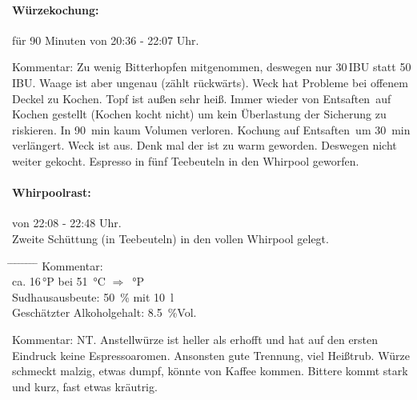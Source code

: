 \documentclass[12pt,oneside,a4paper]{scrartcl}
\begin{document}
\paragraph{Würzekochung:} für 90 Minuten von 20:36 - 22:07 Uhr.
	\begin{adjustwidth}{2cm}{0cm}
		\hspace{-1cm}Kommentar: Zu wenig Bitterhopfen mitgenommen, deswegen nur 30\,IBU statt 50\,IBU. Waage ist aber ungenau (zählt rückwärts). Weck hat Probleme bei offenem Deckel zu Kochen. Topf ist außen sehr heiß. Immer wieder von \glqq Entsaften\grqq\ auf Kochen gestellt (Kochen kocht nicht) um kein Überlastung der Sicherung zu riskieren. In \SI{90}{\minute} kaum Volumen verloren. Kochung auf \glqq Entsaften\grqq\ um \SI{30}{\minute} verlängert. Weck ist aus. Denk mal der ist zu warm geworden. Deswegen nicht weiter gekocht. Espresso in fünf Teebeuteln in den Whirpool geworfen.
	\end{adjustwidth}

\pagebreak[3]
\paragraph{Whirpoolrast:} von 22:08 - 22:48 Uhr.\\

\hspace{1cm} Zweite Schüttung (in Teebeuteln) in den vollen Whirpool gelegt.
	\begin{tabbing}
		\hspace{1cm} \= \hspace{1cm} \= \hspace{1cm} \= \hspace{1cm} \= \hspace{1cm} \= \hspace{1cm} \= \hspace{1cm} \= \hspace{1cm} \= \kill
		\> Kommentar: \>\>\>  \\
		\> \> \> ca. 16\,°P \> \> bei \> \SI{51}{\celsius} \> $\Rightarrow$ \,°P\\
		\> \> Sudhausausbeute: \> \> \> \> \>  \SI{50}{\percent} mit \SI{10}{\litre}\\
		\> \> Geschätzter Alkoholgehalt: \> \> \> \> \> \SI{8,5}{\percent}Vol.
	\end{tabbing}
	\begin{adjustwidth}{2cm}{0cm}
		\hspace{-1cm}Kommentar: NT. Anstellwürze ist heller als erhofft und hat auf den ersten Eindruck keine Espressoaromen. Ansonsten gute Trennung, viel Heißtrub. Würze schmeckt malzig, etwas dumpf, könnte von Kaffee kommen. Bittere kommt stark und kurz, fast etwas kräutrig.
	\end{adjustwidth}
%
\pagebreak[3]
\end{document}
